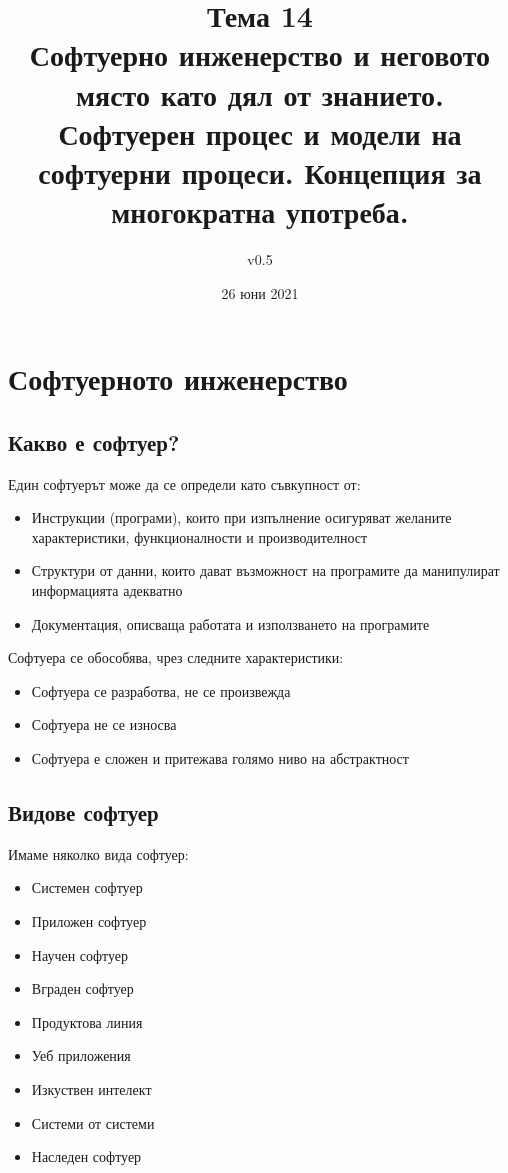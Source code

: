 \documentclass[fleqn,12pt]{article}
\title{Тема 14\\ Софтуерно инженерство и неговото място като дял от знанието. Софтуерен процес и модели на софтуерни процеси. Концепция за многократна употреба.}
\author{v0.5}
\date{26 юни 2021}
\begin{document}
\maketitle

\tableofcontents

\clearpage

\section{Софтуерното  инженерство}
\subsection{Какво  е  софтуер?}
Един софтуерът може да се определи като съвкупност от:
\begin{itemize}
	\item Инструкции (програми), които при изпълнение осигуряват желаните характеристики, функционалности и производителност
	\item Структури от данни, които дават възможност на програмите да манипулират информацията адекватно
	\item Документация, описваща работата и използването на програмите
\end{itemize}

Софтуера се обособява, чрез следните характеристики:
\begin{itemize}
	\item Софтуера се разработва, не се произвежда
	\item Софтуера не се износва
	\item Софтуера е сложен и притежава голямо ниво на абстрактност
\end{itemize}

\subsection{Видове  софтуер}
Имаме няколко вида софтуер:
\begin{itemize}
	\item Системен софтуер
	\item Приложен софтуер
	\item Научен софтуер
	\item Вграден софтуер
	\item Продуктова линия
	\item Уеб приложения
	\item Изкуствен интелект
	\item Системи от системи
	\item Наследен софтуер
\end{itemize}
\end{document}
